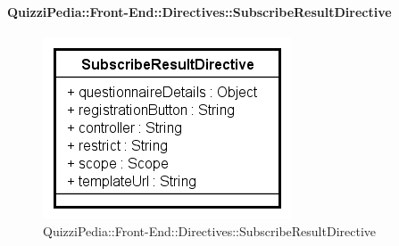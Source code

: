 \paragraph{QuizziPedia::Front-End::Directives::SubscribeResultDirective}

\label{QuizziPedia::Front-End::Directives::SubscribeResultDirective}

\begin{figure}[h]
	\centering
	\includegraphics[scale=0.80,keepaspectratio]{UML/Classi/Front-End/QuizziPedia_Front-end_Directives_SubscribeResultDirective.png}
	\caption{QuizziPedia::Front-End::Directives::SubscribeResultDirective}
\end{figure}

